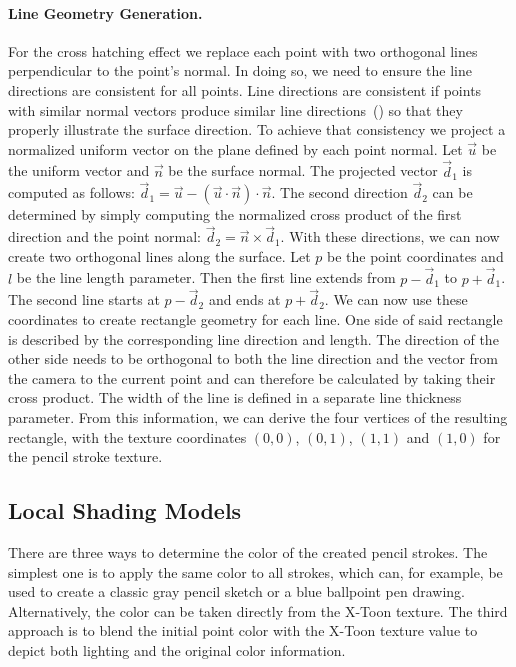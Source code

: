 \documentclass[a4paper,twoside]{article}
\begin{document}
\paragraph{Line Geometry Generation.}
%
For the cross hatching effect we replace each point with two orthogonal lines perpendicular to the point's normal.
In doing so, we need to ensure the line directions are consistent for all points.
Line directions are consistent if points with similar normal vectors produce similar line directions~() so that they properly illustrate the surface direction.
To achieve that consistency we project a normalized uniform vector on the plane defined by each point normal.
%
Let $\vec u$ be the uniform vector and $\vec n$ be the surface normal. 
The projected vector $\vec d_1$ is computed as follows: $\vec d_1 = \vec u - (\vec u \cdot \vec n) \cdot \vec n$.
The second direction $\vec d_2$ can be determined by simply computing the normalized cross product of the first direction and the point normal: $\vec d_2 = \vec n \times \vec d_1$.
With these directions, we can now create two orthogonal lines along the surface. Let $p$ be the point coordinates and $l$ be the line length parameter. 
Then the first line extends from $p - \vec d_1$ to $p + \vec d_1$. The second line starts at $p - \vec d_2$ and ends at $p + \vec d_2$.
We can now use these coordinates to create rectangle geometry for each line. 
One side of said rectangle is described by the corresponding line direction and length. 
The direction of the other side needs to be orthogonal to both the line direction and the vector from the camera to the current point and can therefore be calculated by taking their cross product.
The width of the line is defined in a separate line thickness parameter. 
From this information, we can derive the four vertices of the resulting rectangle, with the texture coordinates $(0,0)$, $(0,1)$, $(1, 1)$ and $(1,0)$ for the pencil stroke texture.



\subsection{Local Shading Models}
\label{PCNPR:Sec:Colors}

There are three ways to determine the color of the created pencil strokes.
The simplest one is to apply the same color to all strokes, which can, for example, be used to create a classic gray pencil sketch or a blue ballpoint pen drawing. Alternatively, the color can be taken directly from the X-Toon texture. The third approach is to blend the initial point color with the X-Toon texture value to depict both lighting and the original color information.
\end{document}
